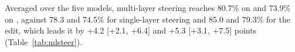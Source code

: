 Averaged over the five models, multi-layer steering reaches 80.7\% on \LB{} and 73.9\% on \AIL{}, against 78.3 and 74.5\% for single-layer steering and 85.0 and 79.3\% for the edit, which leads it by +4.2 [+2.1, +6.4] and +5.3 [+3.1, +7.5] points (Table~\ref{tab:mlsteer}).